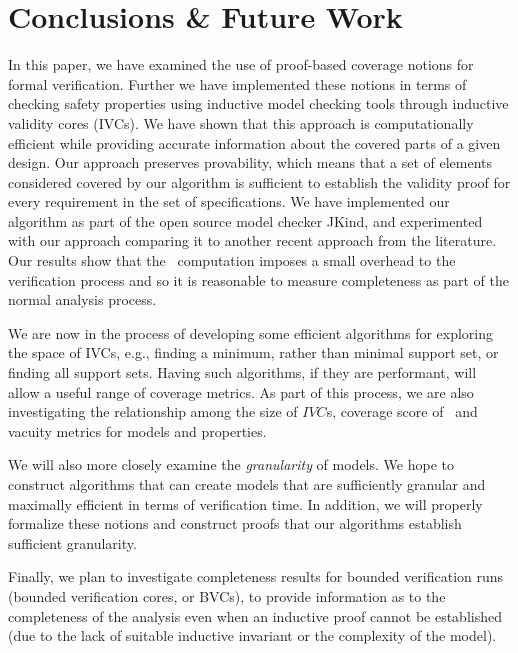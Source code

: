 \section{Conclusions \& Future Work}
\label{sec:conclusion}

In this paper, we have examined the use of proof-based coverage notions for formal verification. 
Further we have implemented these notions in terms of checking safety properties using inductive model checking tools through inductive validity cores (IVCs).  We have shown that this approach
is computationally efficient while providing accurate information about the covered parts of a given design.  Our approach preserves provability, which means that a set of elements considered covered by our algorithm is sufficient to establish the validity proof for every requirement in the set of specifications.
%
We have implemented our algorithm as part of the open source model checker JKind, and experimented with our approach comparing it to another recent approach from the literature.  Our results show that the \ucalg\ computation imposes a small overhead to the verification process and so it is reasonable to measure completeness as part of the normal analysis process.  

We are now in the process of developing some efficient algorithms for exploring the space of IVCs, e.g., finding a minimum, rather than minimal support set, or finding all support sets.  Having such algorithms, if they are performant, will allow a useful range of coverage metrics.  As part of this process, we are also investigating the relationship among the size of $IVC$s, coverage score of \ivccov\, and vacuity metrics for models and properties.  

We will also more closely examine the {\em granularity} of models.  We hope to construct algorithms that can create models that are sufficiently granular and maximally efficient in terms of verification time.  In addition, we will properly formalize these notions and construct proofs that our algorithms establish sufficient granularity.

Finally, we plan to investigate completeness results for bounded verification runs (bounded verification cores, or BVCs), to provide information as to the completeness of the analysis even when an inductive proof cannot be established (due to the lack of suitable inductive invariant or the complexity of the model).

